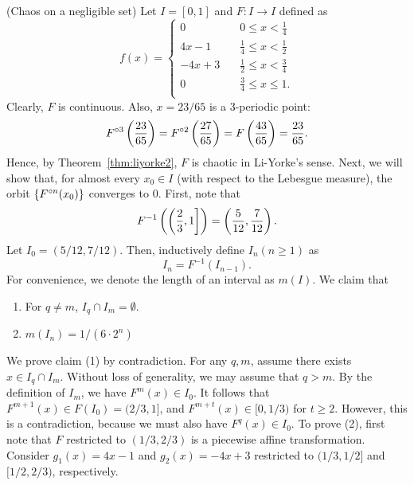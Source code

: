 \documentclass[12pt,draft,twoside]{book}
\begin{document}
\begin{example}
  (Chaos on a negligible set)
  Let $I = [0,1]$ and $F: I \to I$ defined as
  \begin{equation*}
    f(x) =
    \begin{cases}
      0 \quad & 0\leq x < \frac{1}{4} \\
      4x - 1 \quad  & \frac{1}{4} \leq x < \frac{1}{2} \\
      -4x + 3 \quad & \frac{1}{2} \leq x < \frac{3}{4} \\
      0 \quad & \frac{3}{4} \leq x \leq 1. \\
    \end{cases}
  \end{equation*}
  Clearly, $F$ is continuous.
  Also, $x = 23/65$ is a 3-periodic point:
  \begin{equation*}
    F^{\circ 3}\left ( \frac{23}{65} \right ) = F^{\circ 2}\left ( \frac{27}{65} \right ) = F\left ( \frac{43}{65} \right ) = \frac{23}{65}.
  \end{equation*}
Hence, by Theorem~\ref{thm:liyorke2}, $F$ is chaotic in Li-Yorke's sense.
%
Next, we will show that, for almost every $x_0 \in I$ (with respect to the Lebesgue measure), the orbit $\left \{ F^{\circ n}(x_0) \right \}$ converges to 0.
First, note that 
\begin{equation*}
  F^{-1}\left ( \left(\frac{2}{3},1\right] \right ) 
  = \left ( \frac{5}{12},\frac{7}{12} \right ).
\end{equation*}
Let $I_0 = (5/12, 7/12)$.
Then, inductively define $I_n (n\geq 1)$ as 
\begin{equation*}
  I_n = F^{-1}(I_{n-1}).
\end{equation*}
%
For convenience, we denote the length of an interval as $m(I)$.
We claim that
\begin{enumerate}[(1)]
  \item For $q\neq m$, $I_q \cap I_m = \emptyset$.
  \item $m(I_n) = 1/(6 \cdot 2^n)$
\end{enumerate}
%
We prove claim (1) by contradiction.
For any $q,m$, assume there exists $x \in I_q \cap I_m$. 
Without loss of generality, we may assume that $q > m$.
By the definition of $I_m$, we have $F^m(x) \in I_0$.
It follows that $F^{m+1}(x) \in F(I_0) = (2/3, 1]$, and $F^{m+t}(x) \in [0, 1/3)$ for $t \geq 2$.
However, this is a contradiction, because we must also have $F^q(x) \in I_0$.
%
To prove (2), first note that $F$ restricted to $(1/3, 2/3)$ is a piecewise affine transformation.
Consider $g_1(x) = 4x - 1$ and $g_2(x) = -4x + 3$ restricted to $(1/3,1/2]$ and $[1/2,2/3)$, respectively.

\end{example}
\end{document}
